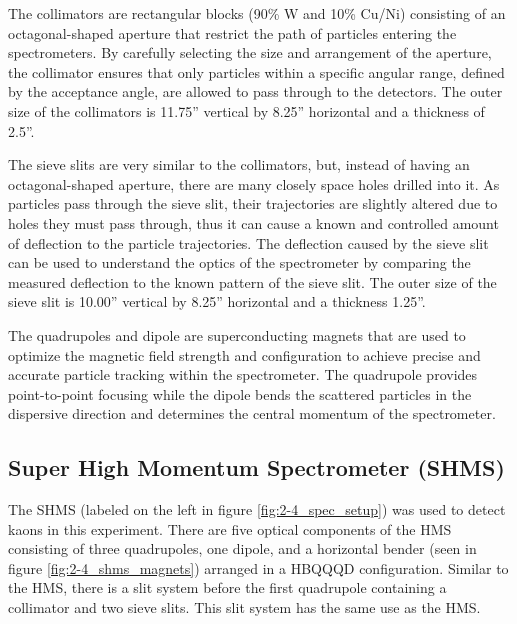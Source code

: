 \documentclass[
]{report}
\begin{document}
The collimators are rectangular blocks (90\% W and 10\% Cu/Ni)
consisting of an octagonal-shaped aperture that restrict the path of
particles entering the spectrometers. By carefully selecting the size
and arrangement of the aperture, the collimator ensures that only
particles within a specific angular range, defined by the acceptance
angle, are allowed to pass through to the detectors. The outer size of
the collimators is 11.75'' vertical by 8.25'' horizontal and a thickness
of 2.5''.

The sieve slits are very similar to the collimators, but, instead of
having an octagonal-shaped aperture, there are many closely space holes
drilled into it. As particles pass through the sieve slit, their
trajectories are slightly altered due to holes they must pass through,
thus it can cause a known and controlled amount of deflection to the
particle trajectories. The deflection caused by the sieve slit can be
used to understand the optics of the spectrometer by comparing the
measured deflection to the known pattern of the sieve slit. The outer
size of the sieve slit is 10.00'' vertical by 8.25'' horizontal and a
thickness 1.25''.



The quadrupoles and dipole are superconducting magnets that are used to
optimize the magnetic field strength and configuration to achieve
precise and accurate particle tracking within the spectrometer. The
quadrupole provides point-to-point focusing while the dipole bends the
scattered particles in the dispersive direction and determines the
central momentum of the spectrometer.

\hypertarget{super-high-momentum-spectrometer-shms}{%
\subsection{Super High Momentum Spectrometer
(SHMS)}\label{super-high-momentum-spectrometer-shms}}

The SHMS (labeled on the left in figure \ref{fig:2-4_spec_setup}) was
used to detect kaons in this experiment. There are five optical
components of the HMS consisting of three quadrupoles, one dipole, and a
horizontal bender (seen in figure \ref{fig:2-4_shms_magnets}) arranged
in a HBQQQD configuration. Similar to the HMS, there is a slit system
before the first quadrupole containing a collimator and two sieve slits.
This slit system has the same use as the HMS.


\end{document}
